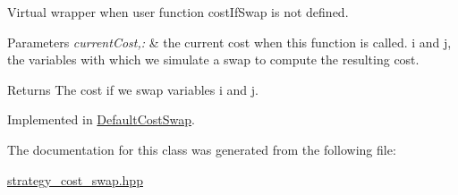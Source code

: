 \-Virtual wrapper when user function cost\-If\-Swap is not defined. 


\begin{DoxyParams}{\-Parameters}
{\em current\-Cost,\-:} & the current cost when this function is called. i and j, the variables with which we simulate a swap to compute the resulting cost. \\
\hline
\end{DoxyParams}
\begin{DoxyReturn}{\-Returns}
\-The cost if we swap variables i and j. 
\end{DoxyReturn}


\-Implemented in \hyperlink{classDefaultCostSwap_a62c43925fb3f931b12f92d3a1bbfc55f}{\-Default\-Cost\-Swap}.



\-The documentation for this class was generated from the following file\-:\begin{DoxyCompactItemize}
\item 
\hyperlink{strategy__cost__swap_8hpp}{strategy\-\_\-cost\-\_\-swap.\-hpp}\end{DoxyCompactItemize}
